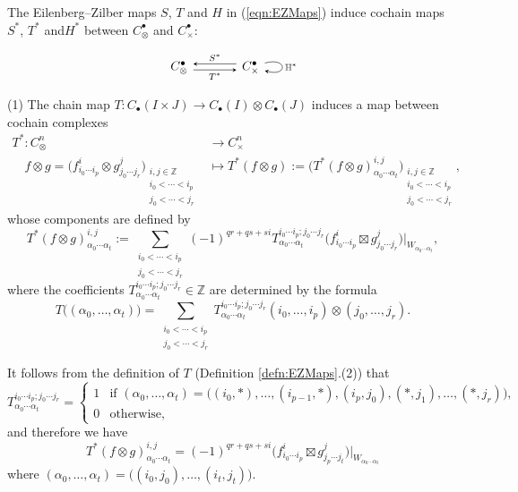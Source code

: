 The Eilenberg--Zilber maps
$S$, $T$ and $H$
in
(\ref{eqn:EZMaps})
induce
cochain maps
$S^*$, $T^*$ and$H^*$
between $C_{\otimes}^{\bullet}$ and $C_{\times}^{\bullet}$:



$$
\begin{tikzcd}[arrow style=tikz,>=stealth,row sep=2.5em,column sep=3.5em]
C_{\otimes}^{\bullet}
  \arrow[r, shift left, <-, "S^*"]
&
C_{\times}^{\bullet}
  \arrow[l, shift left, <-, "T^*"]
  \arrow[loop right, "\mathbb{H}^{\ast}"]
\end{tikzcd}
$$


\begin{dfn}

(1)
The chain map 
$
T:
C_{\bullet}(I\times J)
\rightarrow
C_{\bullet}(I)\otimes C_{\bullet}(J)
$
induces a map between cochain complexes
\begin{align*}
T^*:
C_{\otimes}^n
&\rightarrow
C_{\times}^n
\\
\quad
f\otimes g
=
\Big(
f_{i_0\cdots i_p}^i
\otimes
g_{j_0\cdots j_r}^j
\Big)
_{\substack{
i,j\in\mathbb{Z}
\\
i_0<\cdots<i_p
\\
j_0<\cdots<j_r
}}
&\mapsto
T^*(f\otimes g)
:=
\Big(
T^*(f\otimes g)_{\alpha_0\cdots\alpha_t}^{i,j}
\Big)
_{\substack{
i,j\in\mathbb{Z}
\\
i_0<\cdots<i_p
\\
j_0<\cdots<j_r
}},
\end{align*}
whose components are defined by
$$
T^*(f\otimes g)_{\alpha_0\cdots\alpha_t}^{i,j}
:=
\sum_{\substack{
i_0<\cdots<i_p
\\
j_0<\cdots<j_r
}}
(-1)^{qr+qs+si}
T_{\alpha_0\cdots\alpha_t}^{i_0\cdots i_p;j_0\cdots j_r}
\big(
f_{i_0\cdots i_p}^i
\boxtimes
g_{j_0\cdots j_r}^j
\big)\big|_{W_{\alpha_0\cdots\alpha_t}},
$$
where the coefficients
$
T_{\alpha_0\cdots\alpha_t}^{i_0\cdots i_p;j_0\cdots j_r}
\in\mathbb{Z}
$
are determined by the formula
$$
T\big((\alpha_0,\dots,\alpha_t)\big)
=
\sum_{\substack{
i_0<\cdots<i_p
\\
j_0<\cdots<j_r
}}
T_{\alpha_0\cdots\alpha_t}^{i_0\cdots i_p;j_0\cdots j_r}
(i_0,\dots,i_p)\otimes(j_0,\dots,j_r).
$$

It follows from the definition of $T$
(Definition \ref{defn:EZMaps}.(2))
that
$$
T_{\alpha_0\cdots\alpha_t}^{i_0\cdots i_p;j_0\cdots j_r}
=
\begin{cases}
1
&
\text{if }
(\alpha_0,\dots,\alpha_t)
=
\big((i_0,*),\dots,(i_{p-1},*),(i_p,j_0),(*,j_1),\dots,(*,j_r)\big),
\\
0
&
\text{otherwise},
\end{cases}
$$
and therefore we have
$$
T^*(f\otimes g)_{\alpha_0\cdots\alpha_t}^{i,j}
=
(-1)^{qr+qs+si}
\big(
f_{i_0\cdots i_p}^i
\boxtimes
g_{j_p\cdots j_t}^j
\big)\big|_{W_{\alpha_0\cdots\alpha_t}}
$$
where
$(\alpha_0,\dots,\alpha_t)=\big((i_0,j_0),\dots,(i_t,j_t)\big)$.


\end{dfn}
